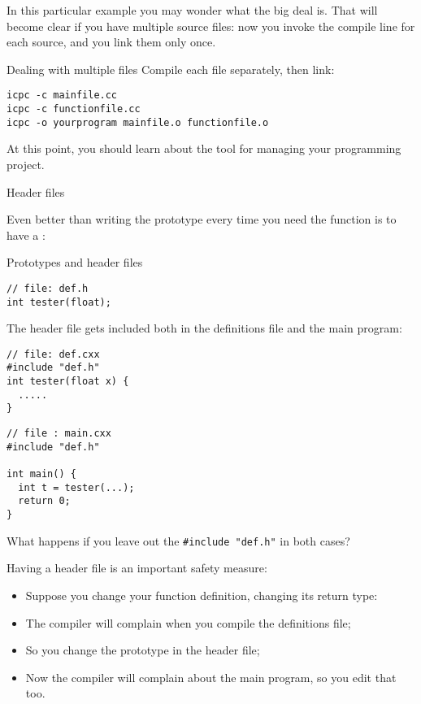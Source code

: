 In this particular example you may wonder what the big deal is.
That will become clear if you have multiple source files: now you
invoke the compile line for each source, and you link them only once.

\begin{block}{Dealing with multiple files}
  \label{sl:link-multiple}
  Compile each file separately, then link:
\begin{verbatim}
icpc -c mainfile.cc
icpc -c functionfile.cc
icpc -o yourprogram mainfile.o functionfile.o
\end{verbatim}  
\end{block}

At this point, you should learn about the  tool for
managing your programming project.

 {Header files}
\label{sec:hfile}

Even better than writing the prototype every time you need the
function is to have a :

\begin{block}{Prototypes and header files}
  \label{sl:proto-header}
\begin{lstlisting}
// file: def.h
int tester(float);
\end{lstlisting}
The header file gets included both in the definitions file and the
main program:
\begin{multicols}{2}  
\begin{lstlisting}
// file: def.cxx
#include "def.h"
int tester(float x) {
  .....
}
\end{lstlisting}
\vfill\columnbreak
\begin{lstlisting}
// file : main.cxx
#include "def.h"

int main() {
  int t = tester(...);
  return 0;
}
\end{lstlisting}
\end{multicols}
What happens if you leave out the \lstinline$#include "def.h"$ in both cases?
\end{block}

Having a header file is an important safety measure:
\begin{itemize}
\item Suppose you change your function definition, changing its return
  type:
\item The compiler will complain when you compile the definitions
  file;
\item So you change the prototype in the header file;
\item Now the compiler will complain about the main program, so you
  edit that too.
\end{itemize}

